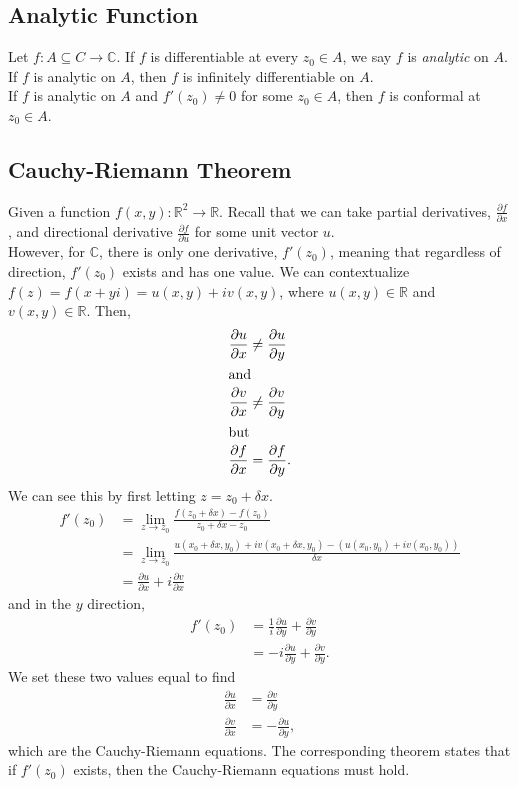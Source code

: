 \documentclass[10pt]{extarticle}
\newcommand{\R}{\mathbb{R}}
\newcommand{\C}{\mathbb{C}}
\begin{document}
  \subsection{Analytic Function}%
  Let $f: A\subseteq C \rightarrow \C$. If $f$ is differentiable at every $z_0 \in A$, we say $f$ is \textit{analytic} on $A$.\\

  If $f$ is analytic on $A$, then $f$ is infinitely differentiable on $A$.\\

  If $f$ is analytic on $A$ and $f'(z_0)\neq 0$ for some $z_0\in A$, then $f$ is conformal at $z_0\in A$. 
  \subsection{Cauchy-Riemann Theorem}%
  Given a function $f(x,y): \R^2\rightarrow \R$. Recall that we can take partial derivatives, $\frac{\partial f}{\partial x}$, and directional derivative $\frac{\partial f}{\partial u}$ for some unit vector $u$.\\

  However, for $\C$, there is only one derivative, $f'(z_0)$, meaning that regardless of direction, $f'(z_0)$ exists and has one value. We can contextualize $f(z) = f(x+yi) = u(x,y) + iv(x,y)$, where $u(x,y)\in\R$ and $v(x,y)\in\R$. Then,
  \begin{align*}
    \frac{\partial u}{\partial x} &\neq \frac{\partial u}{\partial y}\\
    \intertext{and}
    \frac{\partial v}{\partial x} &\neq \frac{\partial v}{\partial y}\\
    \intertext{but}
    \frac{\partial f}{\partial x} &= \frac{\partial f}{\partial y}.
  \end{align*}
  We can see this by first letting $z = z_0 + \delta x$.
  \begin{align*}
    f'(z_0) &= \lim_{z\rightarrow z_0} \frac{f(z_0 + \delta x) - f(z_0)}{z_0 + \delta x - z_0}\\
            &= \lim_{z\rightarrow z_0} \frac{u(x_0 + \delta x, y_0) + iv(x_0 + \delta x, y_0) - (u(x_0,y_0) + iv(x_0,y_0))}{\delta x}\\
            &= \frac{\partial u}{\partial x} + i\frac{\partial v}{\partial x}
  \end{align*}
  and in the $y$ direction,
  \begin{align*}
    f'(z_0) &= \frac{1}{i} \frac{\partial u}{\partial y} + \frac{\partial v}{\partial y}\\
            &= -i \frac{\partial u}{\partial y} + \frac{\partial v}{\partial y}.
  \end{align*}
  We set these two values equal to find
  \begin{align*}
    \frac{\partial u}{\partial x} &= \frac{\partial v}{\partial y}\\
    \frac{\partial v}{\partial x} &= -\frac{\partial u}{\partial y},
  \end{align*}
  which are the Cauchy-Riemann equations. The corresponding theorem states that if $f'(z_0)$ exists, then the Cauchy-Riemann equations must hold.\\
\end{document}
